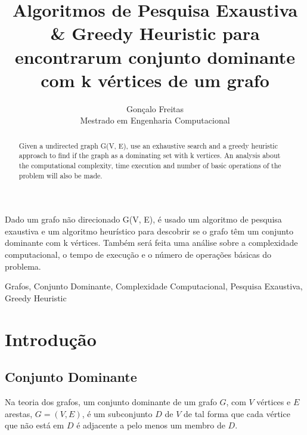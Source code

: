 \documentclass{revdetua}
\begin{document}

\title{Algoritmos de Pesquisa Exaustiva \& Greedy Heuristic para encontrar\newline um conjunto dominante com k vértices de um grafo}
\author{Gonçalo Freitas \\Mestrado em Engenharia Computacional} %
\maketitle

\begin{abstract}%
Given a undirected graph G(V, E), use an exhaustive search and a greedy heuristic approach to find if the graph as a dominating set with k vertices. An analysis about the computational complexity, time execution and number of basic operations of the problem will also be made.
\end{abstract}

\begin{resumo}%
Dado um grafo não direcionado G(V, E), é usado um algoritmo de pesquisa exaustiva e um algoritmo heurístico para descobrir se o grafo têm um conjunto dominante com k vértices. Também será feita uma análise sobre a complexidade computacional, o tempo de execução e o número de operações básicas do problema. 
\end{resumo}


\begin{palavraschave}%
Grafos, Conjunto Dominante, Complexidade Computacional, Pesquisa Exaustiva, Greedy Heuristic
\end{palavraschave}

\section{Introdução}

\subsection{Conjunto Dominante}
\label{Teoria_Grafos}
Na teoria dos grafos, um conjunto dominante de um grafo $G$, com $V$ vértices e $E$ arestas, $G = (V, E)$, é um subconjunto $D$ de $V$ de tal forma que cada vértice que não está em $D$ é adjacente a pelo menos um membro de $D$.
\end{document}
